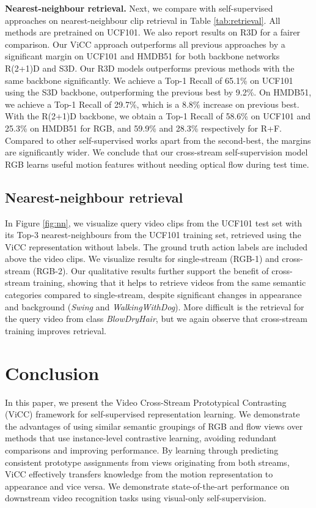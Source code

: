 \documentclass[10pt,twocolumn,letterpaper]{article}
\begin{document}
\noindent
\textbf{Nearest-neighbour retrieval.} Next, we compare with self-supervised approaches on nearest-neighbour clip retrieval in Table \ref{tab:retrieval}. All methods are pretrained on UCF101. We also report results on R3D for a fairer comparison. Our ViCC approach outperforms all previous approaches by a significant margin on UCF101 and HMDB51 for both backbone networks R(2+1)D and S3D. Our R3D models outperforms previous methods with the same backbone significantly. We achieve a Top-1 Recall of 65.1\% on UCF101 using the S3D backbone, outperforming the previous best by 9.2\%. On HMDB51, we achieve a Top-1 Recall of 29.7\%, which is a 8.8\% increase on previous best. With the R(2+1)D backbone, we obtain a Top-1 Recall of 58.6\% on UCF101 and 25.3\% on HMDB51 for RGB, and 59.9\% and 28.3\% respectively for R+F. Compared to other self-supervised works apart from the second-best, the margins are significantly wider. We conclude that our cross-stream self-supervision model RGB learns useful motion features without needing optical flow during test time. 

\subsection{Nearest-neighbour retrieval}
\label{sec:qua}

In Figure \ref{fig:nn}, we visualize query video clips from the UCF101 test set with its Top-3 nearest-neighbours from the UCF101 training set, retrieved using the ViCC representation without labels. The ground truth action labels are included above the video clips. We visualize results for single-stream (RGB-1) and cross-stream (RGB-2). Our qualitative results further support the benefit of cross-stream training, showing that it helps to retrieve videos from the same semantic categories compared to single-stream, despite significant changes in appearance and background (\eg \textit{Swing} and \textit{WalkingWithDog}). More difficult is the retrieval for the query video from class \textit{BlowDryHair}, but we again observe that cross-stream training improves retrieval. 
 \section{Conclusion}
In this paper, we present the Video Cross-Stream Prototypical Contrasting (ViCC) framework for self-supervised representation learning. We demonstrate the advantages of using similar semantic groupings of RGB and flow views over methods that use instance-level contrastive learning, avoiding redundant comparisons and improving performance. By learning through predicting consistent prototype assignments from views originating from both streams, ViCC effectively transfers knowledge from the motion representation to appearance and vice versa. We demonstrate state-of-the-art performance on downstream video recognition tasks using visual-only self-supervision. \vspace{0.8em}
\end{document}
